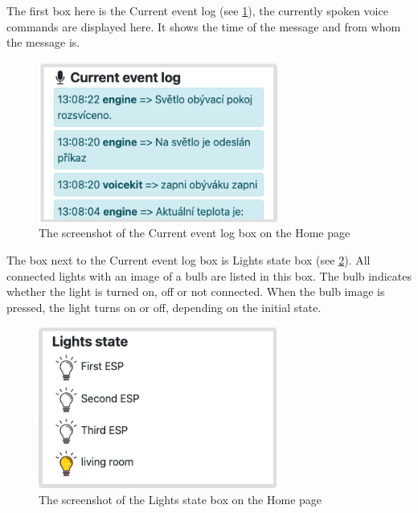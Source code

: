 The first box here is the Current event log (see \cref{fig:screenshot_home_current_event_log}), the currently spoken voice commands are displayed here. It shows the time of the message and from whom the message is. 

\begin{figure}[H]
    \centering
    \includegraphics[width=0.7\textwidth]{img/screenshot_home_current_event_log.png}
    \caption{The screenshot of the Current event log box on the Home page}
    \label{fig:screenshot_home_current_event_log}
\end{figure}

The box next to the Current event log box is Lights state box (see \cref{fig:screenshot_home_lights_state}). All connected lights with an image of a bulb are listed in this box. The bulb indicates whether the light is turned on, off or not connected. When the bulb image is pressed, the light turns on or off, depending on the initial state.

\begin{figure}[H]
    \centering
    \includegraphics[width=0.7\textwidth]{img/screenshot_home_lights_state.png}
    \caption{The screenshot of the Lights state box on the Home page}
    \label{fig:screenshot_home_lights_state}
\end{figure}

